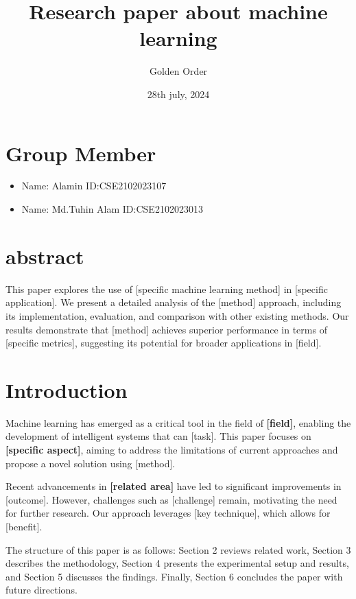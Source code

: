 \documentclass{article}
\title{Research paper about machine learning}
\author{Golden Order}
\date{28th july, 2024}
\begin{document}
\maketitle
\section{Group Member}
\begin{itemize}%
    \item \hspace{.4cm}  Name: Alamin \hspace{2.2cm} ID:CSE2102023107
    \item \hspace{.5cm}Name: Md.Tuhin Alam \hspace{1cm}ID:CSE2102023013
\end{itemize}
\section{abstract}
This paper explores the use of [specific machine learning method] in [specific application]. We present a detailed analysis of the [method] approach, including its implementation, evaluation, and comparison with other existing methods. Our results demonstrate that [method] achieves superior performance in terms of [specific metrics], suggesting its potential for broader applications in [field].


\section{Introduction}
Machine learning has emerged as a critical tool in the field of \textbf{[field]}, enabling the development of intelligent systems that can [task]. This paper focuses on \textbf{[specific aspect]}, aiming to address the limitations of current approaches and propose a novel solution using [method].

Recent advancements in \textbf{[related area]} have led to significant improvements in [outcome]. However, challenges such as [challenge] remain, motivating the need for further research. Our approach leverages [key technique], which allows for [benefit].

The structure of this paper is as follows: Section 2 reviews related work, Section 3 describes the methodology, Section 4 presents the experimental setup and results, and Section 5 discusses the findings. Finally, Section 6 concludes the paper with future directions.
\end{document}
